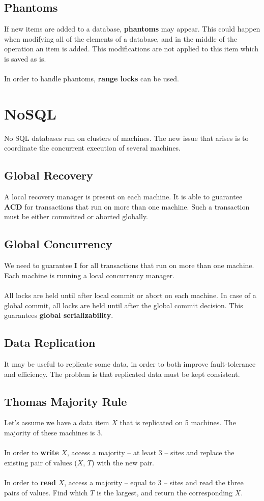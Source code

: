 \documentclass{article}
\begin{document}
\subsection{Phantoms}
If new items are added to a database, \textbf{phantoms} may appear. This could happen when modifying all of the elements of a database, and in the middle of the operation an item is added. This modifications are not applied to this item which is saved as is. \\ \\
In order to handle phantoms, \textbf{range locks} can be used.

\section{NoSQL}
No SQL databases run on clusters of machines. The new issue that arises is to coordinate the concurrent execution of several machines.

\subsection{Global Recovery}
A local recovery manager is present on each machine. It is able to guarantee \textbf{ACD} for transactions that run on more than one machine. Such a transaction must be either committed or aborted globally.

\subsection{Global Concurrency}
We need to guarantee \textbf{I} for all transactions that run on more than one machine. Each machine is running a local concurrency manager. \\ \\
All locks are held until after local commit or abort on each machine. In case of a global commit, all locks are held until after the global commit decision. This guarantees \textbf{global serializability}.

\subsection{Data Replication}
It may be useful to replicate some data, in order to both improve fault-tolerance and efficiency. The problem is that replicated data must be kept consistent.

\subsection{Thomas Majority Rule}
Let's assume we have a data item $X$ that is replicated on 5 machines. The majority of these machines is 3. \\ \\
In order to \textbf{write} $X$, access a majority -- at least 3 -- sites and replace the existing pair of values ($X$, $T$) with the new pair. \\ \\
In order to \textbf{read} $X$, access a majority -- equal to 3 -- sites and read the three pairs of values. Find which $T$ is the largest, and return the corresponding $X$.
\end{document}
